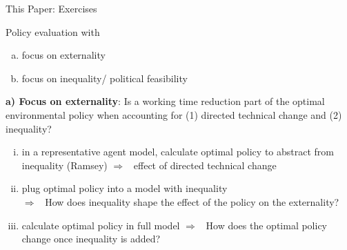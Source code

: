 \documentclass[11pt,aspectratio=169]{beamer}
\newcommand{\ar}{$\Rightarrow$ \ }
\begin{document}
\begin{frame}{This Paper: Exercises}
\begin{block}{Policy evaluation with}
\begin{enumerate}[a)]
	\item focus on externality
	\item focus on inequality/ political feasibility
\end{enumerate}
\end{block} 
\pause
	\textbf{a) Focus on externality}: Is a working time reduction part of the optimal environmental policy when accounting for (1) directed technical change and (2) inequality?
	\vspace{0mm}
	\begin{enumerate}[(i)]
		\item in a representative agent model, calculate optimal policy to abstract from inequality (Ramsey)
		\ar effect of directed technical change
		\item plug optimal policy into a model with inequality\\ 
		\ar How does inequality shape the effect of the policy on the externality?
		\item calculate optimal policy in full model \ar How does the optimal policy change once inequality is added?
	\end{enumerate}

\end{frame}

\end{document}
